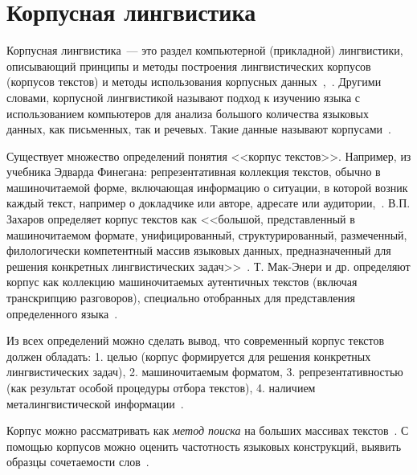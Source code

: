 \section{Корпусная лингвистика}\label{sect_review_corpus_linguistics}

Корпусная лингвистика~--- это раздел компьютерной (прикладной) лингвистики, 
описывающий принципы и методы 
построения лингвистических корпусов (корпусов текстов)
и методы использования корпусных данных~\cite[3]{Zakharov2005},~\cite[407]{Kibrik2019}.
Другими словами, корпусной лингвистикой называют подход к изучению языка с использованием компьютеров для анализа большого количества языковых данных, как письменных, так и речевых. Такие данные называют корпусами~\cite[11]{BrezinaMcEnery2020}.

Существует множество определений понятия <<корпус текстов>>. Например, из учебника Эдварда Финегана: репрезентативная коллекция текстов, обычно в машиночитаемой форме, включающая информацию о ситуации, в которой возник каждый текст, например о докладчике или авторе, адресате или аудитории,~\cite[24]{Finegan2006}. В.П. Захаров определяет корпус текстов как <<большой, представленный в машиночитаемом формате, унифицированный, структурированный, размеченный, филологически компетентный массив языковых данных, предназначенный для решения конкретных лингвистических задач>>~\cite[11]{ZakharovBogdanova2020}.
Т. Мак-Энери и др. определяют корпус как коллекцию машиночитаемых аутентичных текстов (включая транскрипцию разговоров), специально отобранных для представления определенного языка~\cite[5]{McEnery2006}.


Из всех определений можно сделать вывод, что современный корпус текстов должен обладать: 
    1. целью (корпус формируется для решения конкретных лингвистических задач),
    2. машиночитаемым форматом, 
    3. репрезентативностью (как результат особой процедуры отбора текстов), 
    4. наличием металингвистической информации~\cite[11-12]{ZakharovBogdanova2020}.

Корпус можно рассматривать как \emph{метод поиска} 
на больших массивах текстов~\cite[18]{Kozera2019CorpusAsMethod}. 
С помощью корпусов можно оценить частотность языковых конструкций, 
выявить образцы сочетаемости слов~\cite[18]{Kozera2019CorpusAsMethod}. 


